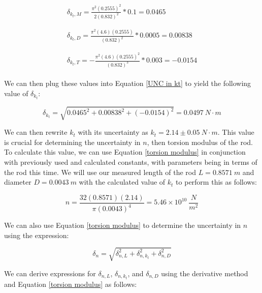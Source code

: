 \documentclass[12pt]{article}
\begin{document}
\begin{align*}
    \begin{split}
        \delta_{k_t,M}=\frac{\pi^2(0.2555)^2}{2(0.832)^2}*0.1=0.0465
    \end{split} \\ \\
    \begin{split}
        \delta_{k_t,D}=\frac{\pi^2(4.6)(0.2555)}{(0.832)^2}*0.0005=0.00838
    \end{split} \\ \\
    \begin{split}
        \delta_{k_t,T}=-\frac{\pi^2(4.6)(0.2555)^2}{(0.832)^3}*0.003=-0.0154
    \end{split}
\end{align*}

We can then plug these values into Equation \ref{UNC in kt} to yield the following value of $\delta_{k_t}$:

\begin{equation*}
    \delta_{k_t} = \sqrt{0.0465^2 + 0.00838^2 + (-0.0154)^2}=0.0497\ N\cdot m
\end{equation*}

We can then rewrite $k_t$ with its uncertainty as $k_t=2.14\pm0.05\ N\cdot m$. This value is crucial for determining the uncertainty in $n$, then torsion modulus of the rod. To calculate this value, we can use Equation \ref{torsion modulus} in conjunction with previously used and calculated constants, with parameters being in terms of the rod this time. We will use our measured length of the rod $L=0.8571\ m$ and diameter $D=0.0043\ m$ with the calculated value of $k_t$ to perform this as follows:

\begin{equation*}
    n=\frac{32(0.8571)(2.14)}{\pi(0.0043)^4}=5.46\times10^{10}\ \frac{N}{m^2}
\end{equation*}

We can also use Equation \ref{torsion modulus} to determine the uncertainty in $n$ using the expression:

\begin{equation}
    \delta_{n}=\sqrt{\delta_{n,L}^2+\delta_{n,k_t}^2+\delta_{n,D}^2} \label{UNC in n}
\end{equation}

We can derive expressions for $\delta_{n,L}$, $\delta_{n,k_t}$, and $\delta_{n,D}$ using the derivative method and Equation \ref{torsion modulus} as follows:
\end{document}
